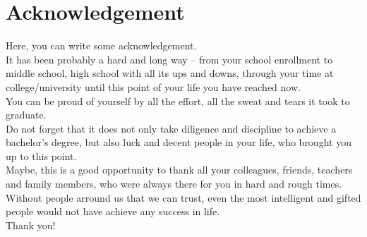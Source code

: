 \chapter*{Acknowledgement}
\thispagestyle{empty}

\noindent Here, you can write some acknowledgement. \\

\noindent It has been probably a hard and long way -- from your school enrollment to middle school, high school with all its ups and downs, through your time at college/university until this point of your life you have reached now. \\ 

\noindent You can be proud of yourself by all the effort, all the sweat and tears it took to graduate. \\

Do not forget that it does not only take diligence and discipline to achieve a bachelor's degree, but also luck and decent people in your life, who brought you up to this point. \\
\noindent Maybe, this is a good opportunity to thank all your colleagues, friends, teachers and family members, who were always there for you in hard and rough times.
Without people arround us that we can trust, even the most intelligent and gifted people would not have achieve any success in life. \\
\noindent Thank you!
